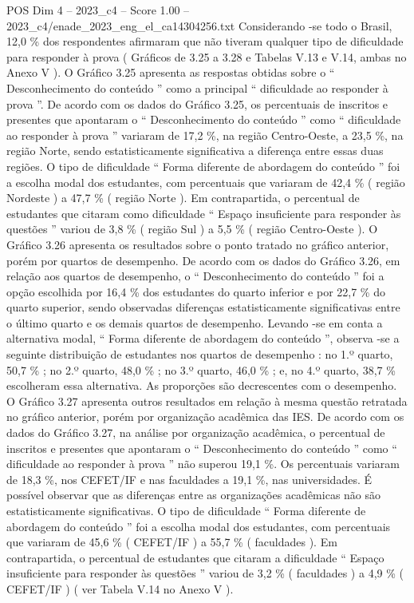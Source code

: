 \begin{textsample}{POS Dim 4 – 2023\_c4 – Score 1.00 – 2023\_c4/enade\_2023\_eng\_el\_ca14304256.txt}
Considerando -se todo o Brasil, 12,0 \% dos respondentes afirmaram que não tiveram qualquer tipo de dificuldade para responder à prova ( Gráficos de 3.25 a 3.28 e Tabelas V.13 e V.14, ambas no Anexo V ).
O Gráfico 3.25 apresenta as respostas obtidas sobre o “ Desconhecimento do conteúdo ” como a principal “ dificuldade ao responder à prova ”.
De acordo com os dados do Gráfico 3.25, os percentuais de inscritos e presentes que apontaram o “ Desconhecimento do conteúdo ” como “ dificuldade ao responder à prova ” variaram de 17,2 \%, na região Centro-Oeste, a 23,5 \%, na região Norte, sendo estatisticamente significativa a diferença entre essas duas regiões.
O tipo de dificuldade “ Forma diferente de abordagem do conteúdo ” foi a escolha modal dos estudantes, com percentuais que variaram de 42,4 \% ( região Nordeste ) a 47,7 \% ( região Norte ).
Em contrapartida, o percentual de estudantes que citaram como dificuldade “ Espaço insuficiente para responder às questões ” variou de 3,8 \% ( região Sul ) a 5,5 \% ( região Centro-Oeste ).
O Gráfico 3.26 apresenta os resultados sobre o ponto tratado no gráfico anterior, porém por quartos de desempenho.
De acordo com os dados do Gráfico 3.26, em relação aos quartos de desempenho, o “ Desconhecimento do conteúdo ” foi a opção escolhida por 16,4 \% dos estudantes do quarto inferior e por 22,7 \% do quarto superior, sendo observadas diferenças estatisticamente significativas entre o último quarto e os demais quartos de desempenho.
Levando -se em conta a alternativa modal, “ Forma diferente de abordagem do conteúdo ”, observa -se a seguinte distribuição de estudantes nos quartos de desempenho : no 1.º quarto, 50,7 \% ; no 2.º quarto, 48,0 \% ; no 3.º quarto, 46,0 \% ; e, no 4.º quarto, 38,7 \% escolheram essa alternativa.
As proporções são decrescentes com o desempenho.
O Gráfico 3.27 apresenta outros resultados em relação à mesma questão retratada no gráfico anterior, porém por organização acadêmica das IES.
De acordo com os dados do Gráfico 3.27, na análise por organização acadêmica, o percentual de inscritos e presentes que apontaram o “ Desconhecimento do conteúdo ” como “ dificuldade ao responder à prova ” não superou 19,1 \%.
Os percentuais variaram de 18,3 \%, nos CEFET/IF e nas faculdades a 19,1 \%, nas universidades.
É possível observar que as diferenças entre as organizações acadêmicas não são estatisticamente significativas.
O tipo de dificuldade “ Forma diferente de abordagem do conteúdo ” foi a escolha modal dos estudantes, com percentuais que variaram de 45,6 \% ( CEFET/IF ) a 55,7 \% ( faculdades ).
Em contrapartida, o percentual de estudantes que citaram a dificuldade “ Espaço insuficiente para responder às questões ” variou de 3,2 \% ( faculdades ) a 4,9 \% ( CEFET/IF ) ( ver Tabela V.14 no Anexo V ).

\end{textsample}
